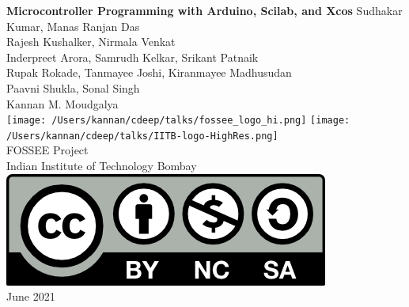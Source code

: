 \begin{center}
{\bf {\Huge Microcontroller Programming with Arduino, Scilab, and Xcos}}
\vfill
%
Sudhakar Kumar, Manas Ranjan Das \\
Rajesh Kushalker, Nirmala Venkat \\
Inderpreet Arora, Samrudh Kelkar, Srikant Patnaik \\
Rupak Rokade, Tanmayee Joshi, Kiranmayee Madhusudan \\
Paavni Shukla, Sonal Singh \\
Kannan M. Moudgalya \\
\vfill
\texttt{[image: /Users/kannan/cdeep/talks/fossee\_logo\_hi.png]} \quad
\texttt{[image: /Users/kannan/cdeep/talks/IITB-logo-HighRes.png]} \\
FOSSEE Project \\
Indian Institute of Technology Bombay \\ [2mm]
\includegraphics[width=0.15\linewidth]{by-nc-sa.png} \\ [1mm]
June 2021
\end{center}

\clearpage
